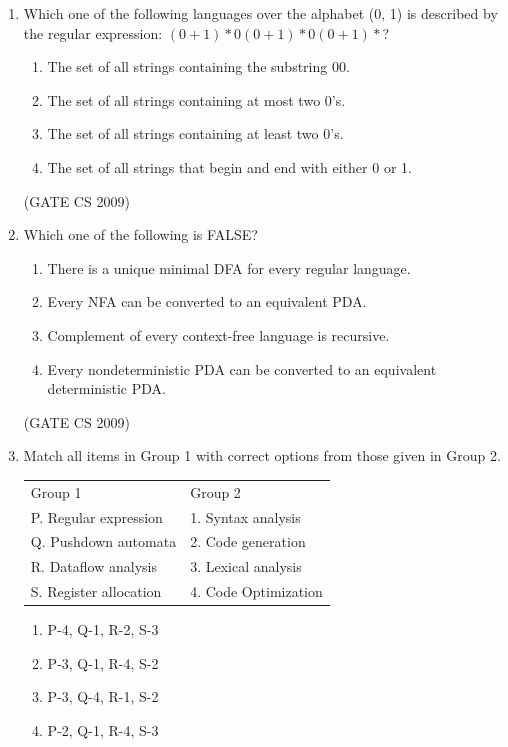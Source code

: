 \documentclass[a4paper, 11pt]{article}
\begin{document}
\begin{enumerate}
    \item Which one of the following languages over the alphabet (0, 1) is described by the regular expression: $(0+1)*0(0+1)*0(0+1)*$?
    \begin{enumerate} 
        \item The set of all strings containing the substring 00. 
        \item The set of all strings containing at most two 0's.
        \item The set of all strings containing at least two 0's.
        \item The set of all strings that begin and end with either 0 or 1.
    \end{enumerate}

    \hfill (GATE CS 2009)

    \item Which one of the following is FALSE?
    \begin{enumerate} 
        \item There is a unique minimal DFA for every regular language.
        \item Every NFA can be converted to an equivalent PDA.
        \item Complement of every context-free language is recursive.
        \item Every nondeterministic PDA can be converted to an equivalent deterministic PDA.
    \end{enumerate}

    \hfill (GATE CS 2009)

    \item Match all items in Group 1 with correct options from those given in Group 2.\\
    \begin{tabular}{ll}
        Group 1 & Group 2 \\
        P. Regular expression & 1. Syntax analysis\\
        Q. Pushdown automata & 2. Code generation\\
        R. Dataflow analysis & 3. Lexical analysis \\
        S. Register allocation & 4. Code Optimization
    \end{tabular}
    
    \begin{enumerate} 
        \item P-4, Q-1, R-2, S-3
        \item P-3, Q-1, R-4, S-2 
        \item P-3, Q-4, R-1, S-2
        \item P-2, Q-1, R-4, S-3
    \end{enumerate}


\end{enumerate}
\end{document}

